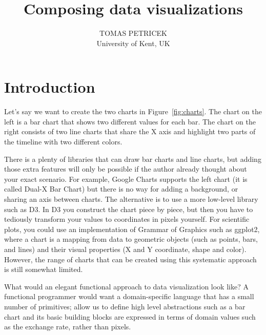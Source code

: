 \documentclass{jfp}
\title{Composing data visualizations}
\author[Tomas Petricek]{TOMAS PETRICEK\\
       University of Kent, UK\\
       \email{t.petricek@kent.ac.uk}}
\begin{document}
\maketitle[f]





\section{Introduction}
Let's say we want to create the two charts in Figure~\ref{fig:charts}. The chart on the left is
a bar chart that shows two different values for each bar. The chart on the right consists of two
line charts that share the X axis and highlight two parts of the timeline with two different colors.

There is a plenty of libraries that can draw bar charts and line charts, but adding those extra
features will only be possible if the author already thought about your exact scenario. For
example, Google Charts supports the left chart (it is called Dual-X Bar Chart) but there is no
way for adding a background, or sharing an axis between charts. The alternative is to use a more
low-level library such as D3. In D3 you construct the chart piece by piece, but then you have to
tediously transform your values to coordinates in pixels yourself. For scientific plots,
you could use an implementation of Grammar of Graphics such as ggplot2, where a chart is
a mapping from data to geometric objects (such as points, bars, and lines) and their visual
properties (X and Y coordinate, shape and color). However, the range of charts that can be
created using this systematic approach is still somewhat limited.

What would an elegant functional approach to data visualization look like? A functional programmer
would want a domain-specific language that has a small number of primitives; allow us to define
high level abstractions such as a bar chart and its basic building blocks are expressed in terms
of domain values such as the exchange rate, rather than pixels.
\end{document}
